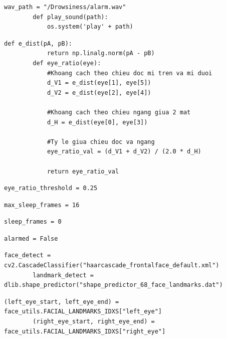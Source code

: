     \begin{lstlisting}[caption={Setup sound file and turn it on}]
        wav_path = "/Drowsiness/alarm.wav"
        def play_sound(path):
            os.system('play' + path)
    \end{lstlisting}

    \begin{lstlisting}[caption={Compute the distance between 2 point A and B}]
        def e_dist(pA, pB):
            return np.linalg.norm(pA - pB)
        def eye_ratio(eye):
            #Khoang cach theo chieu doc mi tren va mi duoi
            d_V1 = e_dist(eye[1], eye[5])
            d_V2 = e_dist(eye[2], eye[4])
        
            #Khoang cach theo chieu ngang giua 2 mat
            d_H = e_dist(eye[0], eye[3])
        
            #Ty le giua chieu doc va ngang
            eye_ratio_val = (d_V1 + d_V2) / (2.0 * d_H)
            
            return eye_ratio_val
    \end{lstlisting}

    \begin{lstlisting}[caption={Define threshold level. If smaller than this is drowsiness}]
        eye_ratio_threshold = 0.25
    \end{lstlisting}

    \begin{lstlisting}[caption={Threshold so frame lien tuc nham mat}]
        max_sleep_frames = 16
    \end{lstlisting}

    \begin{lstlisting}[caption={Dem so frame ngu}]
        sleep_frames = 0
    \end{lstlisting}

    \begin{lstlisting}[caption={Check xem da canh bao hay chua}]
        alarmed = False 
    \end{lstlisting}

    \begin{lstlisting}[caption={Khoi tao cac module detect mat va facial landmark}]
        face_detect = cv2.CascadeClassifier("haarcascade_frontalface_default.xml")
        landmark_detect = dlib.shape_predictor("shape_predictor_68_face_landmarks.dat")
    \end{lstlisting}

    \begin{lstlisting}[caption={Lay danh sach cac cum diem landmark cho 2 mat}]
        (left_eye_start, left_eye_end) = face_utils.FACIAL_LANDMARKS_IDXS["left_eye"]
        (right_eye_start, right_eye_end) = face_utils.FACIAL_LANDMARKS_IDXS["right_eye"]
    \end{lstlisting}

